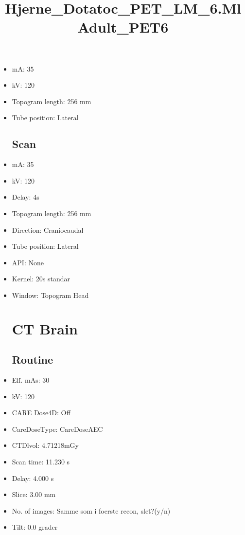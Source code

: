 \documentclass[12pt]{article}
\title{Hjerne\_Dotatoc\_PET\_LM\_6.MlAdult\_PET6}
\begin{document}
\maketitle
\newpage
\tableofcontents
\newpage
{}


\begin{itemize}\section{Topogram}
\subsection{Routine}
\item mA: 35\item kV: 120\item Topogram length: 256 mm\item Tube position: Lateral
\subsection{Scan}\item mA: 35\item kV: 120\item Delay: 4s\item Topogram length: 256 mm\item Direction: Craniocaudal\item Tube position: Lateral\item API: None\item Kernel: 20s standar\item Window: Topogram Head
\section{CT Brain}
\subsection{Routine}
\item Eff. mAs: 30\item kV: 120\item CARE Dose4D: Off\item CareDoseType: CareDoseAEC\item CTDlvol: 4.71218mGy\item Scan time: 11.230 s\item Delay: 4.000 s\item Slice: 3.00 mm\item No. of images: Samme som i foerste recon, slet?(y/n)\item Tilt: 0.0 grader

\end{itemize}
\end{document}
